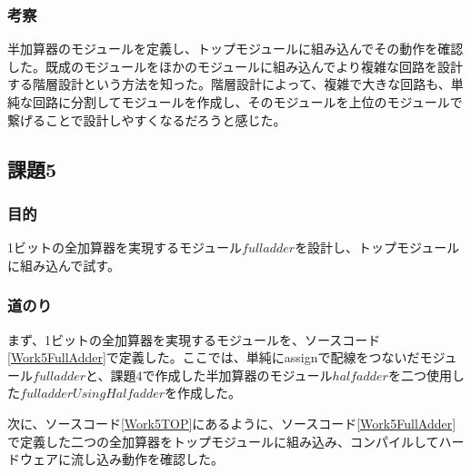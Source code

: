 \documentclass[a4paper]{jarticle}
\begin{document}
\subsubsection{考察}
半加算器のモジュールを定義し、トップモジュールに組み込んでその動作を確認した。既成のモジュールをほかのモジュールに組み込んでより複雑な回路を設計する階層設計という方法を知った。階層設計によって、複雑で大きな回路も、単純な回路に分割してモジュールを作成し、そのモジュールを上位のモジュールで繋げることで設計しやすくなるだろうと感じた。
\subsection{課題5}
\subsubsection{目的}
1ビットの全加算器を実現するモジュール$fulladder$を設計し、トップモジュールに組み込んで試す。
\subsubsection{道のり}
まず、1ビットの全加算器を実現するモジュールを、ソースコード\ref{Work5FullAdder}で定義した。ここでは、単純にassignで配線をつないだモジュール$fulladder$と、課題4で作成した半加算器のモジュール$halfadder$を二つ使用した$fulladderUsingHalfadder$を作成した。

次に、ソースコード\ref{Work5TOP}にあるように、ソースコード\ref{Work5FullAdder}で定義した二つの全加算器をトップモジュールに組み込み、コンパイルしてハードウェアに流し込み動作を確認した。

\end{document}
